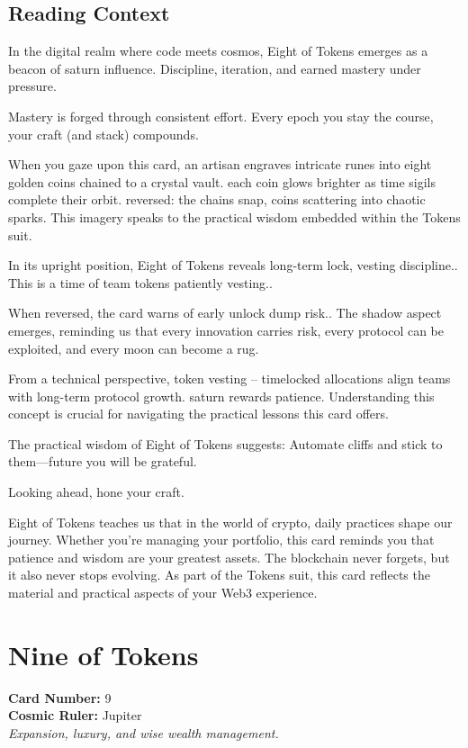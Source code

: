 \documentclass[11pt,oneside]{book}
\begin{document}
\begin{minipage}[t]{0.55\textwidth}
  \subsection*{Reading Context}
  In the digital realm where code meets cosmos, Eight of Tokens emerges as a beacon of saturn influence. Discipline, iteration, and earned mastery under pressure.

  Mastery is forged through consistent effort. Every epoch you stay the course, your craft (and stack) compounds.

  When you gaze upon this card, an artisan engraves intricate runes into eight golden coins chained to a crystal vault. each coin glows brighter as time sigils complete their orbit. reversed: the chains snap, coins scattering into chaotic sparks. This imagery speaks to the practical wisdom embedded within the Tokens suit.

  In its upright position, Eight of Tokens reveals long-term lock, vesting discipline.. This is a time of team tokens patiently vesting..

  When reversed, the card warns of early unlock dump risk.. The shadow aspect emerges, reminding us that every innovation carries risk, every protocol can be exploited, and every moon can become a rug.

  From a technical perspective, token vesting – timelocked allocations align teams with long-term protocol growth. saturn rewards patience. Understanding this concept is crucial for navigating the practical lessons this card offers.

  The practical wisdom of Eight of Tokens suggests: Automate cliffs and stick to them—future you will be grateful.

  Looking ahead, hone your craft.

  Eight of Tokens teaches us that in the world of crypto, daily practices shape our journey. Whether you're managing your portfolio, this card reminds you that patience and wisdom are your greatest assets. The blockchain never forgets, but it also never stops evolving. As part of the Tokens suit, this card reflects the material and practical aspects of your Web3 experience.

\end{minipage}

\newpage
\section*{Nine of Tokens}

\begin{minipage}[t]{0.55\textwidth}
  \vspace{0pt}
  \textbf{Card Number:} 9\\  \textbf{Cosmic Ruler:} Jupiter\\  \textit{Expansion, luxury, and wise wealth management.}
\end{minipage}
\end{document}
